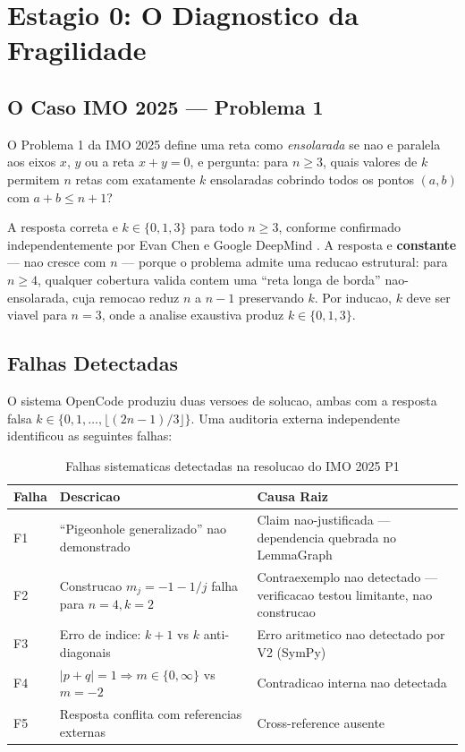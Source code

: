 \documentclass[5p]{elsarticle}
\begin{document}
\section{Estagio 0: O Diagnostico da Fragilidade}

\subsection{O Caso IMO 2025 — Problema 1}

O Problema 1 da IMO 2025 \cite{imo2025} define uma reta como \textit{ensolarada}
se nao e paralela aos eixos $x$, $y$ ou a reta $x+y=0$, e pergunta: para $n\geq 3$,
quais valores de $k$ permitem $n$ retas com exatamente $k$ ensolaradas cobrindo
todos os pontos $(a,b)$ com $a+b\leq n+1$?

A resposta correta e $k\in\{0,1,3\}$ para todo $n\geq 3$, conforme confirmado
independentemente por Evan Chen \cite{chen2025} e Google DeepMind \cite{deepmind2025}.
A resposta e \textbf{constante} — nao cresce com $n$ — porque o problema admite
uma reducao estrutural: para $n\geq 4$, qualquer cobertura valida contem uma
``reta longa de borda'' nao-ensolarada, cuja remocao reduz $n$ a $n-1$ preservando
$k$. Por inducao, $k$ deve ser viavel para $n=3$, onde a analise exaustiva produz
$k\in\{0,1,3\}$.

\subsection{Falhas Detectadas}

O sistema OpenCode produziu duas versoes de solucao, ambas com a resposta falsa
$k\in\{0,1,\dots,\lfloor(2n-1)/3\rfloor\}$. Uma auditoria externa independente
\cite{corrigendum2026} identificou as seguintes falhas:

\begin{table}[H]
  \centering
  \caption{Falhas sistematicas detectadas na resolucao do IMO 2025 P1}
  \label{tab:failures}
  \begin{tabular}{p{3cm}p{6cm}p{5cm}}
    \toprule
    \textbf{Falha} & \textbf{Descricao} & \textbf{Causa Raiz} \\
    \midrule
    F1 & ``Pigeonhole generalizado'' nao demonstrado & Claim nao-justificada — dependencia quebrada no LemmaGraph \\
    F2 & Construcao $m_j=-1-1/j$ falha para $n=4,k=2$ & Contraexemplo nao detectado — verificacao testou limitante, nao construcao \\
    F3 & Erro de indice: $k+1$ vs $k$ anti-diagonais & Erro aritmetico nao detectado por V2 (SymPy) \\
    F4 & $|p+q|=1\Rightarrow m\in\{0,\infty\}$ vs $m=-2$ & Contradicao interna nao detectada \\
    F5 & Resposta conflita com referencias externas & Cross-reference ausente \\
    \bottomrule
  \end{tabular}
\end{table}
\end{document}
